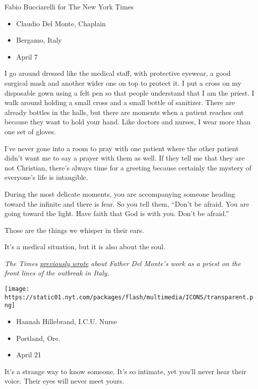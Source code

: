 Fabio Bucciarelli for The New York Times

\begin{itemize}
\tightlist
\item
  Claudio Del Monte, Chaplain
\item
  Bergamo, Italy
\item
  April 7
\end{itemize}

I go around dressed like the medical staff, with protective eyewear, a
good surgical mask and another wider one on top to protect it. I put a
cross on my disposable gown using a felt pen so that people understand
that I am the priest. I walk around holding a small cross and a small
bottle of sanitizer. There are already bottles in the halls, but there
are moments when a patient reaches out because they want to hold your
hand. Like doctors and nurses, I wear more than one set of gloves.

I've never gone into a room to pray with one patient where the other
patient didn't want me to say a prayer with them as well. If they tell
me that they are not Christian, there's always time for a greeting
because certainly the mystery of everyone's life is intangible.

During the most delicate moments, you are accompanying someone heading
toward the infinite and there is fear. So you tell them, ``Don't be
afraid. You are going toward the light. Have faith that God is with you.
Don't be afraid.''

Those are the things we whisper in their ears.

It's a medical situation, but it is also about the soul.

\emph{The Times}
\emph{\href{https://www.nytimes.com/2020/04/11/world/europe/italy-priests-coronavirus.html}{previously
wrote}} \emph{about Father Del Monte's work as a priest on the front
lines of the outbreak in Italy.}

\texttt{[image: https://static01.nyt.com/packages/flash/multimedia/ICONS/transparent.png]}

\begin{itemize}
\tightlist
\item
  Hannah Hillebrand, I.C.U. Nurse
\item
  Portland, Ore.
\item
  April 21
\end{itemize}

It's a strange way to know someone. It's so intimate, yet you'll never
hear their voice. Their eyes will never meet yours.

